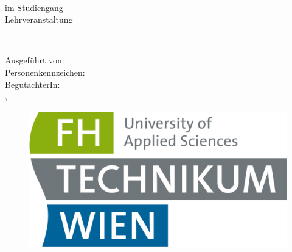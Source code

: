 
\begin{titlepage}

	\vspace*{0cm}
	{\begin{flushleft} \bfseries\huge
			\mytitle\\
	\end{flushleft}}
	{\begin{flushleft} \large
			im Studiengang \mycourse\\
			Lehrveranstaltung \mysubject\\
	\end{flushleft}}

	\vspace{3cm}
	{\begin{flushleft} \bfseries\huge
			\mythema\\
	\end{flushleft}}

	{\begin{flushleft} \large
			Ausgeführt von: \myauthor\\
			Personenkennzeichen: \mykennzeichen\\[10mm]
			BegutachterIn: \myteacher\\[10mm]
			\myort, \mydatum\\
	\end{flushleft}}

	\vfill
	\begin{figure}[!h]
		\begin{flushleft}
			\includegraphics[width=0.35\linewidth]{images/FHTW_logo.png}
		\end{flushleft}
	\end{figure}

\end{titlepage}
